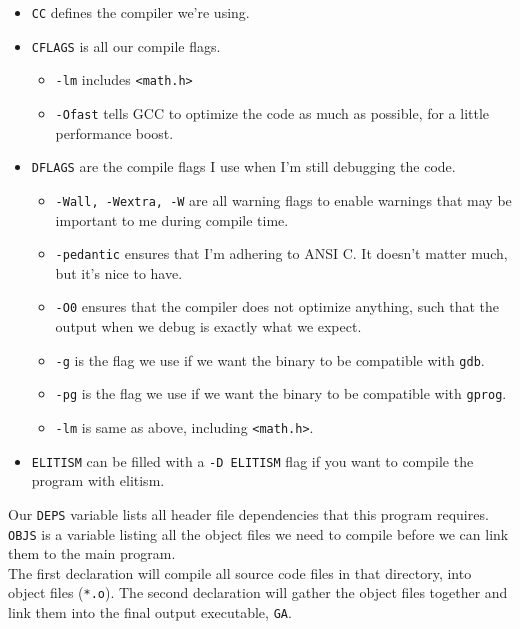 \documentclass[12pt]{article}
\begin{document}
    \begin{itemize}
        \item \verb|CC| defines the compiler we're using.
        \item \verb|CFLAGS| is all our compile flags.
        \begin{itemize}
            \item \verb|-lm| includes \verb|<math.h>|
            \item \verb|-Ofast| tells GCC to optimize the code as much as possible, for a little performance boost.
        \end{itemize}
        \item \verb|DFLAGS| are the compile flags I use when I'm still debugging the code.
        \begin{itemize}
            \item \verb|-Wall, -Wextra, -W| are all warning flags to enable warnings that may be important to me during compile time.
            \item \verb|-pedantic| ensures that I'm adhering to ANSI C. It doesn't matter much, but it's nice to have.
            \item \verb|-O0| ensures that the compiler does not optimize anything, such that the output when we debug is exactly what we expect.
            \item \verb|-g| is the flag we use if we want the binary to be compatible with \verb|gdb|.
            \item \verb|-pg| is the flag we use if we want the binary to be compatible with \verb|gprog|.
            \item \verb|-lm| is same as above, including \verb|<math.h>|.
        \end{itemize}
        \item \verb|ELITISM| can be filled with a \verb|-D ELITISM| flag if you want to compile the program with elitism.
    \end{itemize}

    Our \verb|DEPS| variable lists all header file dependencies that this program requires. \verb|OBJS| is a variable listing all the object files we need to compile before we can link them to the main program. \\

    The first declaration will compile all source code files in that directory, into object files (\verb|*.o|). The second declaration will gather the object files together and link them into the final output executable, \verb|GA|. \\
\end{document}
